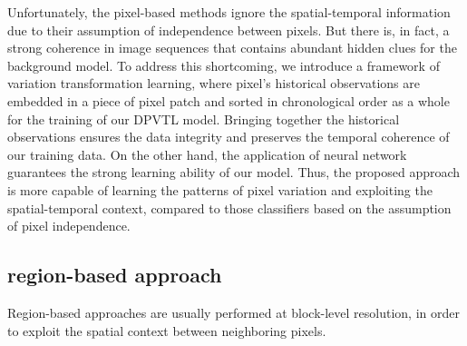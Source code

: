 \documentclass[journal]{IEEEtran}
\begin{document}
Unfortunately,
the pixel-based methods ignore the spatial-temporal information due to their assumption of independence between pixels.
But there is, in fact, a strong coherence in image sequences that contains abundant hidden clues for the background model. 
%
To address this shortcoming, we introduce a framework of variation transformation learning, where pixel's historical observations are embedded in a piece of pixel patch and sorted in chronological order as a whole for the training of our DPVTL model.
Bringing together the historical observations ensures the data integrity and preserves the temporal coherence of our training data. 
On the other hand, the application of neural network guarantees the strong learning ability of our model.
Thus, the proposed approach is more capable of learning the patterns of pixel variation and exploiting the spatial-temporal context, compared to those classifiers based on the assumption of pixel independence. 
%
%
%
%
%
%
\subsection{region-based approach}
Region-based approaches are usually performed at block-level resolution, in order to exploit the spatial context between neighboring pixels.
%
\end{document}
